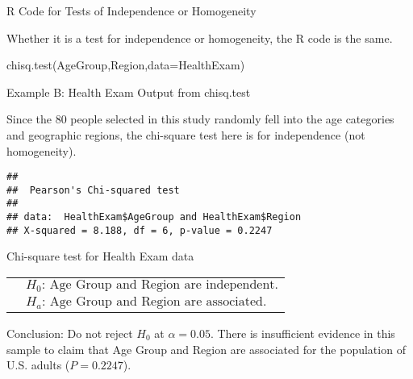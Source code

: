 \documentclass[12pt,ignorenonframetext,aspectratio=169]{beamer}
\begin{document}
\begin{frame}{R Code for Tests of Independence or Homogeneity}

Whether it is a test for independence or homogeneity, the R code is the
same.

chisq.test(AgeGroup,Region,data=HealthExam)


\end{frame}

\begin{frame}[fragile]{Example B: Health Exam Output from chisq.test}

Since the 80 people selected in this study randomly fell into the age
categories and geographic regions, the chi-square test here is for
independence (not homogeneity).

\begin{verbatim}
## 
##  Pearson's Chi-squared test
## 
## data:  HealthExam$AgeGroup and HealthExam$Region
## X-squared = 8.188, df = 6, p-value = 0.2247
\end{verbatim}

\note{}

\end{frame}

\begin{frame}{Chi-square test for Health Exam data}

\begin{table}
\centering
\begin{tabular}{ll}
\hspace{3em} & $H_0 \text{: Age Group and Region are independent.}$ \\
\hspace{3em} & $H_a \text{: Age Group and Region are associated.}$ \\
\end{tabular}
\end{table}

Conclusion: Do not reject \(H_0\) at \(\alpha=0.05\). There is
insufficient evidence in this sample to claim that Age Group and Region
are associated for the population of U.S. adults (\(P=0.2247\)).


\end{frame}
\end{document}
